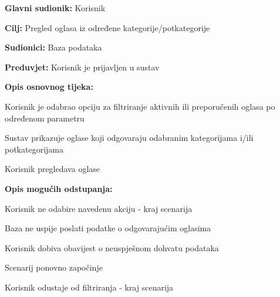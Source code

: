 					\noindent {}
					\begin{packed_item}
	
						\item \textbf{Glavni sudionik: }Korisnik
						\item  \textbf{Cilj:} Pregled oglasa iz određene kategorije/potkategorije
						\item  \textbf{Sudionici:} Baza podataka
						\item  \textbf{Preduvjet:} Korisnik je prijavljen u sustav
						\item  \textbf{Opis osnovnog tijeka:}
						
						\item[] \begin{packed_enum}
							\item Korisnik je odabrao opciju za filtriranje aktivnih ili preporučenih oglasa po određenom parametru
							\item Sustav prikazuje oglase koji odgovaraju odabranim kategorijama i/ili potkategorijama
							\item Korisnik pregledava oglase
						\end{packed_enum}
						
						\item  \textbf{Opis mogućih odstupanja:}

						\item[] \begin{packed_item}
							\item[1.a] Korisnik ne odabire navedenu akciju - kraj scenarija
							\item[2.a] Baza ne uspije poslati podatke o odgovarajućim oglasima
							\item[] \begin{packed_enum}							
								\item Korisnik dobiva obavijest o neuspješnom dohvatu podataka
								\item
									\begin{packed_enum}
										\item Scenarij ponovno započinje
										\item Korisnik odustaje od filtriranja - kraj scenarija
									\end{packed_enum}			
							\end{packed_enum}	


\end{packed_item}
\end{packed_item}
